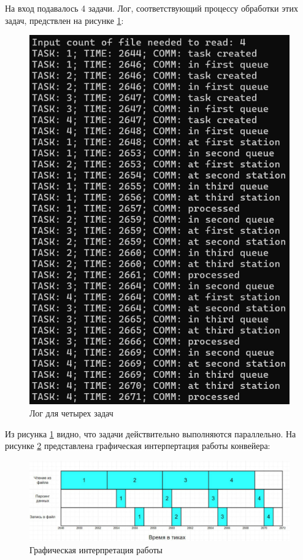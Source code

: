 \documentclass[a4paper, 12pt]{extreport}
\begin{document}
На вход подавалось 4 задачи. Лог, соответствующий процессу обработки этих задач, предствлен на рисунке \ref{pic:log}:
\begin{figure}[h]
	\centering
	\includegraphics[scale=0.8]{tools/log.png}
	\caption{Лог для четырех задач}
	\label{pic:log}
\end{figure}

Из рисунка \ref{pic:log} видно, что задачи действительно выполняются параллельно. На рисунке \ref{pic:model} представлена
графическая интерпертация работы конвейера:
\clearpage\begin{figure}[h]
	\centering
	\includegraphics[scale=0.5]{tools/model.png}
	\caption{Графическая интерпретация работы}
	\label{pic:model}
\end{figure}
\end{document}
